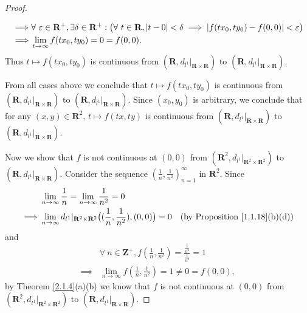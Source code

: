 \begin{proof}
\begin{itemize}
\begin{align*}
                  \implies & \forall\ \varepsilon \in \mathbf{R}^+, \exists \delta \in \mathbf{R}^+ : \big(\forall\ t \in \mathbf{R}, \abs*{t - 0} < \delta \implies \abs*{f(t x_0, t y_0) - f(0, 0)} < \varepsilon\big) \\
                  \implies & \lim_{t \to \infty} f(t x_0, t y_0) = 0 = f(0, 0).
              \end{align*}
              Thus \(t \mapsto f(t x_0, t y_0)\) is continuous from \((\mathbf{R}, d_{l^1}|_{\mathbf{R} \times \mathbf{R}})\) to \((\mathbf{R}, d_{l^1}|_{\mathbf{R} \times \mathbf{R}})\).
    \end{itemize}
    From all cases above we conclude that \(t \mapsto f(t x_0, t y_0)\) is  continuous from \((\mathbf{R}, d_{l^1}|_{\mathbf{R} \times \mathbf{R}})\) to \((\mathbf{R}, d_{l^1}|_{\mathbf{R} \times \mathbf{R}})\).
    Since \((x_0, y_0)\) is arbitrary, we conclude that for any \((x, y) \in \mathbf{R}^2\), \(t \mapsto f(tx, ty)\) is continuous from \((\mathbf{R}, d_{l^1}|_{\mathbf{R} \times \mathbf{R}})\) to \((\mathbf{R}, d_{l^1}|_{\mathbf{R} \times \mathbf{R}})\).

    Now we show that \(f\) is not continuous at \((0, 0)\) from \((\mathbf{R}^2, d_{l^1}|_{\mathbf{R}^2 \times \mathbf{R}^2})\) to \((\mathbf{R}, d_{l^1}|_{\mathbf{R} \times \mathbf{R}})\).
    Consider the sequence \((\frac{1}{n}, \frac{1}{n^2})_{n = 1}^\infty\) in \(\mathbf{R}^2\).
    Since
    \begin{align*}
                 & \lim_{n \to \infty} \frac{1}{n} = \lim_{n \to \infty} \frac{1}{n^2} = 0                                                                                        \\
        \implies & \lim_{n \to \infty} d_{l^1}|_{\mathbf{R}^2 \times \mathbf{R}^2}\big((\frac{1}{n}, \frac{1}{n^2}), (0, 0)\big) = 0 & \text{(by Proposition \ref{1.1.18}(b)(d))}
    \end{align*}
    and
    \begin{align*}
                 & \forall\ n \in \mathbf{Z}^+, f(\frac{1}{n}, \frac{1}{n^2}) = \frac{\frac{1}{n^2}}{\frac{1}{n^2}} = 1 \\
        \implies & \lim_{n \to \infty} f(\frac{1}{n}, \frac{1}{n^2}) = 1 \neq 0 = f(0, 0),
    \end{align*}
    by Theorem \ref{2.1.4}(a)(b) we know that \(f\) is not continuous at \((0, 0)\) from \((\mathbf{R}^2, d_{l^1}|_{\mathbf{R}^2 \times \mathbf{R}^2})\) to \((\mathbf{R}, d_{l^1}|_{\mathbf{R} \times \mathbf{R}})\).
\end{proof}